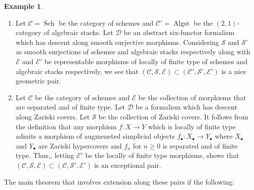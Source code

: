 \documentclass[14pt]{article}
\theoremstyle{definition}
\newtheorem{example}[theorem]{Example}
\newcommand{\E}{\mathcal{E}}
\newcommand{\D}{\mathcal{D}}
\newcommand{\op}[1]{\operatorname{#1}}
\renewcommand{\S}{\mathcal{S}}
\newcommand{\Ca}{\mathcal{C}}
\newcommand{\bb}{\bullet}
\numberwithin{subsection}{section}
\begin{document}
    \begin{example}

    \begin{enumerate}
      \item Let $\Ca= \op{Sch}$ be the category of schemes and $\Ca'= \op{Algst}$ be the $(2,1)$-category of algebraic stacks. Let $\D$ be an abstract six-functor formalism which has descent along smooth surjective morphisms.  Considering $\S$ and $\S'$ as smooth surjections of schemes and algebraic stacks respectively along with $\E$ and $\E'$ be representable morphisms of locally of finite type of schemes and algebraic stacks respectively, we see that $(\Ca,\S,\E) \subset (\Ca',\S',\E')$ is a nice geometric pair.
         \item Let $\Ca$ be the category of schemes and $\E$ be the collection of morphisms that are separated and of finite type. Let $\D$ be a formalism which has descent along Zariski covers. Let $\S$ be the collection of Zariski covers. It follows from the definition that any morphism $f: X \to Y$ which is locally of finite type admits a morphism of augmeneted simplicial objects $f_{\bb}: X_{\bb} \to Y_{\bb}$ where $X_{\bb}$ and $Y_{\bb}$ are Zariski hypercovers and $f_n$ for $n \ge 0$ is separated and of finite type. Thus,, letting $\E'$ be the locally of finite type morphisms, shows that $(\Ca,\S,\E) \subset (\Ca,\S',\E')$ is an exceptional pair.
         \end{enumerate}
        \end{example}
The main theorem that involves extension along these pairs if the following:
\end{document}
